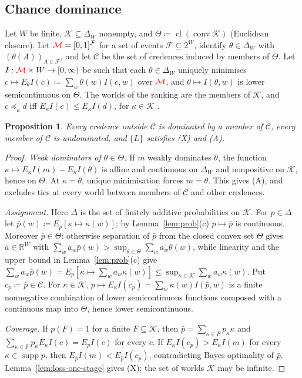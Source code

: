 \documentclass[11pt]{article}
\newcommand{\chg}[1]{{\color{red}#1}}
\newtheorem{proposition}[theorem]{Proposition}
\theoremstyle{definition}
\theoremstyle{remark}
\newcommand{\M}{\mathcal M}
\newcommand{\C}{\mathcal C}
\newcommand{\supp}{\operatorname{supp}}
\newcommand{\cl}{\operatorname{cl}}
\begin{document}
\subsection{Chance dominance}

Let $W$ be finite, $\mathcal K\subseteq\Delta_W$ nonempty, and $\Theta\coloneqq\cl(\operatorname{conv}\mathcal K)$ (Euclidean closure). Let $\chg{\M}=[0,1]^{\mathcal F}$ for a set of events $\mathcal F\subseteq2^W$, identify $\theta\in\Delta_W$ with $(\theta(A))_{A\in\mathcal F}$, and let $\C$ be the set of credences induced by members of $\Theta$. Let $I:\chg{\M}\times W\to[0,\infty)$ be such that each $\theta\in\Delta_W$ uniquely minimises $c\mapsto E_\theta I(c)\coloneqq\sum_w\theta(w)I(c,w)$ over $\chg{\M}$, and $\theta\mapsto I(\theta,w)$ is lower semicontinuous on $\Theta$. The worlds of the ranking are the members of $\mathcal K$, and $c\preceq_\kappa d$ iff $E_\kappa I(c)\le E_\kappa I(d)$, for $\kappa\in\mathcal K$ \cite[Chapter~10]{Pettigrew2016}.

\begin{proposition}\label{prop:chance}
Every credence outside $\C$ is dominated by a member of $\C$, every member of $\C$ is undominated, and $\{L\}$ satisfies \chg{(X) and (A)}.
\end{proposition}
\begin{proof}
\emph{Weak dominators of $\theta\in\Theta$.} If $m$ weakly dominates $\theta$, the function $\kappa\mapsto E_\kappa I(m)-E_\kappa I(\theta)$ is affine and continuous on $\Delta_W$ and nonpositive on $\mathcal K$, hence on $\Theta$. At $\kappa=\theta$, unique minimisation forces $m=\theta$. This gives (A), and excludes ties at every world between members of $\C$ and other credences.

\emph{Assignment.} Here $\Delta$ is the set of finitely additive probabilities on $\mathcal K$. For $p\in\Delta$ let $\bar p(w)\coloneqq E_p[\kappa\mapsto\kappa(w)]$; by Lemma~\ref{lem:prob}(c) $p\mapsto\bar p$ is continuous. Moreover $\bar p\in\Theta$: otherwise separation of $\bar p$ from the closed convex set $\Theta$ gives $a\in\mathbb R^W$ with $\sum_wa_w\bar p(w)>\sup_{\theta\in\Theta}\sum_wa_w\theta(w)$, while linearity and the upper bound in Lemma~\ref{lem:prob}(c) give $\sum_wa_w\bar p(w)=E_p[\kappa\mapsto\sum_wa_w\kappa(w)]\le\sup_{\kappa\in\mathcal K}\sum_wa_w\kappa(w)$. Put $c_p\coloneqq\bar p\in\C$. For $\kappa\in\mathcal K$, $p\mapsto E_\kappa I(c_p)=\sum_w\kappa(w)I(\bar p,w)$ is a finite nonnegative combination of lower semicontinuous functions composed with a continuous map into $\Theta$, hence lower semicontinuous.

\emph{Coverage.} If $p(F)=1$ for a finite $F\subseteq\mathcal K$, then $\bar p=\sum_{\kappa\in F}p_\kappa\kappa$ and $\sum_{\kappa\in F}p_\kappa E_\kappa I(c)=E_{\bar p}I(c)$ for every $c$. If $E_\kappa I(c_p)>E_\kappa I(m)$ for every $\kappa\in\supp p$, then $E_{\bar p}I(m)<E_{\bar p}I(c_p)$, contradicting Bayes optimality of $\bar p$. Lemma~\ref{lem:loss-one-stage} gives (X); the set of worlds $\mathcal K$ may be infinite.
\end{proof}
\end{document}
